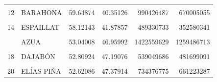 \documentclass[10pt,landscape,a3paper]{article}
\begin{document}
\begin{table}[H]
\begin{tabular}[t]{llrrrr}
\addlinespace
\cellcolor{lightgray}{11} & \cellcolor{lightgray}{PUERTO PLATA} & \cellcolor{lightgray}{62.25984} & \cellcolor{lightgray}{37.74016} & \cellcolor{lightgray}{1124498325} & \cellcolor{lightgray}{681639068}\\
12 & BARAHONA & 59.64874 & 40.35126 & 990426487 & 670005055\\
\cellcolor{lightgray}{13} & \cellcolor{lightgray}{HERMANAS MIRABAL} & \cellcolor{lightgray}{58.42910} & \cellcolor{lightgray}{41.57090} & \cellcolor{lightgray}{249509302} & \cellcolor{lightgray}{177519888}\\
14 & ESPAILLAT & 58.12143 & 41.87857 & 489330733 & 352580341\\
\cellcolor{lightgray}{15} & \cellcolor{lightgray}{DUARTE} & \cellcolor{lightgray}{58.01404} & \cellcolor{lightgray}{41.98596} & \cellcolor{lightgray}{956931584} & \cellcolor{lightgray}{692551115}\\
\addlinespace
16 & AZUA & 53.04008 & 46.95992 & 1422559629 & 1259486713\\
\cellcolor{lightgray}{17} & \cellcolor{lightgray}{SAN JUAN} & \cellcolor{lightgray}{52.85447} & \cellcolor{lightgray}{47.14553} & \cellcolor{lightgray}{1778257738} & \cellcolor{lightgray}{1586183858}\\
18 & DAJABÓN & 52.80924 & 47.19076 & 539049686 & 481699091\\
\cellcolor{lightgray}{19} & \cellcolor{lightgray}{SANCHEZ RAMÍREZ} & \cellcolor{lightgray}{52.80050} & \cellcolor{lightgray}{47.19950} & \cellcolor{lightgray}{626044975} & \cellcolor{lightgray}{559635063}\\
20 & ELÍAS PIÑA & 52.62086 & 47.37914 & 734376775 & 661223287\\
\bottomrule
\end{tabular}
\end{table}
\end{document}

